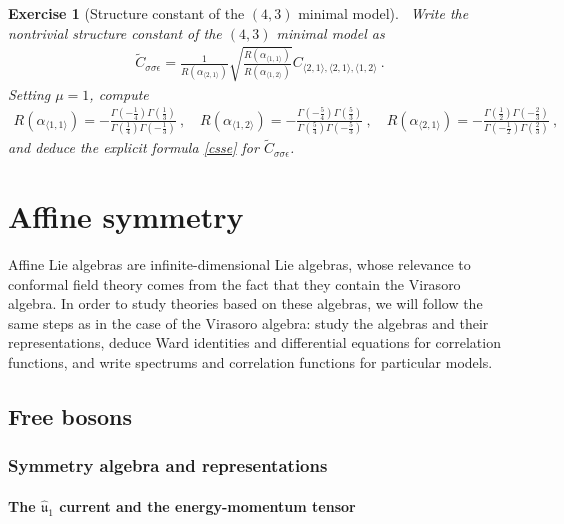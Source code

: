 \documentclass[12pt, a4paper, notitlepage, twoside]{report}
\numberwithin{equation}{section}
\theoremstyle{break}
\newtheorem{exo}{Exercise}[chapter]
\begin{document}
\begin{exo}[Structure constant of the $(4,3)$ minimal model]
 ~\label{exocsse}
Write the nontrivial structure constant of the $(4,3)$ minimal model as
\begin{align}
 \tilde{C}_{\sigma\sigma\epsilon} = \frac{1}{R(\alpha_{\langle 2,1 \rangle})}\sqrt{\frac{R(\alpha_{\langle 1,1 \rangle})}{R(\alpha_{\langle 1,2 \rangle})}} C_{\langle 2,1\rangle , \langle 2,1 \rangle,\langle 1,2 \rangle}\ .
\end{align}
Setting $\mu=1$, compute
\begin{align}
 R(\alpha_{\langle 1,1 \rangle}) = -\frac{\Gamma(-\frac14)\Gamma(\frac13)}{\Gamma(\frac14)\Gamma(-\frac13)} \ , \quad R(\alpha_{\langle 1,2 \rangle}) = -\frac{\Gamma(-\frac54)\Gamma(\frac53)}{\Gamma(\frac54)\Gamma(-\frac53)} \ , \quad R(\alpha_{\langle 2,1 \rangle}) = -\frac{\Gamma(\frac12)\Gamma(-\frac23)}{\Gamma(-\frac12)\Gamma(\frac23)}\ ,
\end{align}
and deduce the explicit formula \eqref{csse} for $\tilde{C}_{\sigma\sigma\epsilon}$.
\end{exo}


\chapter{Affine symmetry \label{secaff}}

Affine Lie algebras are infinite-dimensional Lie algebras, whose relevance to conformal field theory comes from the fact that they contain the Virasoro algebra.
In order to study theories based on these algebras, we will follow the same steps as in the case of the Virasoro algebra: study the algebras and their representations, deduce Ward identities and differential equations for correlation functions, and write spectrums and correlation functions for particular models. 

\section{Free bosons}

\subsection{Symmetry algebra and representations \label{secaua}}

\subsubsection{The \boldmath $\hat{\mathfrak{u}}_1$ current and the energy-momentum tensor}
\end{document}
